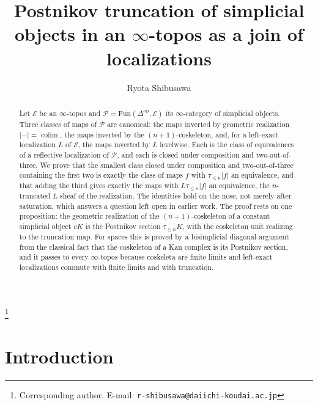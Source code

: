 \documentclass[11pt]{amsart}
\theoremstyle{definition}
\newcommand{\Fun}{\mathrm{Fun}}
\newcommand{\E}{\mathcal E}
\newcommand{\sP}{\mathcal P}
\newcommand{\tr}[1]{\tau_{\le #1}}
\newcommand{\re}{|{-}|}
\begin{document}
\title[Postnikov truncation as a join of localizations]{Postnikov truncation
  of simplicial objects in an $\infty$-topos as a join of localizations}
\author{Ryota Shibusawa}
\thanks{Corresponding author. E-mail: \texttt{r-shibusawa@daiichi-koudai.ac.jp}}
\address{Daiichi Institute of Technology}

\begin{abstract}
Let $\E$ be an $\infty$-topos and $\sP=\Fun(\Delta^{\mathrm{op}},\E)$ its
$\infty$-category of simplicial objects. Three classes of maps of $\sP$ are
canonical: the maps inverted by geometric realization $\re=\operatorname{colim}$,
the maps inverted by the $(n{+}1)$-coskeleton, and, for a left-exact
localization $L$ of $\E$, the maps inverted by $L$ levelwise. Each is the
class of equivalences of a reflective localization of $\sP$, and each is closed
under composition and two-out-of-three. We prove that the smallest class
closed under composition and two-out-of-three containing the first two is
exactly the class of maps $f$ with $\tr n|f|$ an equivalence, and that adding
the third gives exactly the maps with $L\tr n|f|$ an equivalence, the
$n$-truncated $L$-sheaf of the realization. The identities hold on the nose,
not merely after saturation, which answers a question left open in earlier
work. The proof rests on one proposition: the geometric realization of the
$(n{+}1)$-coskeleton of a constant simplicial object $cK$ is the Postnikov
section $\tr nK$, with the coskeleton unit realizing to the truncation map.
For spaces this is proved by a bisimplicial diagonal argument from the
classical fact that the coskeleton of a Kan complex is its Postnikov section,
and it passes to every $\infty$-topos because coskeleta are finite limits and
left-exact localizations commute with finite limits and with truncation.
\end{abstract}

\maketitle

\section{Introduction}
\end{document}
